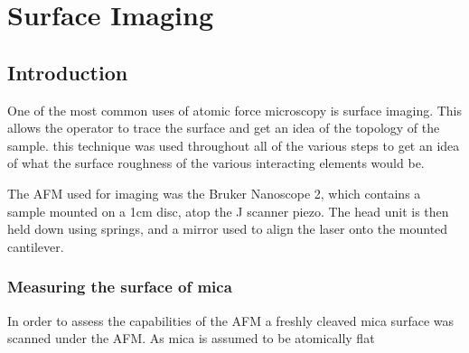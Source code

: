 
\chapter{Surface Imaging}

\section{Introduction}

One of the most common uses of atomic force microscopy is surface imaging. This allows the operator to trace the surface and get an idea of the topology of the sample. this technique was used throughout all of the various steps to get an idea of what the surface roughness of the various interacting elements would be. 

The AFM used for imaging was the Bruker Nanoscope 2, which contains a sample mounted on a 1cm disc, atop the J scanner piezo. The head unit is then held down using springs, and a mirror used to align the laser onto the mounted cantilever.

\subsection{Measuring the surface of mica}

In order to assess the capabilities of the AFM a freshly cleaved mica surface was scanned under the AFM. As mica is assumed to be atomically flat 

\cite{MicaSurf}

